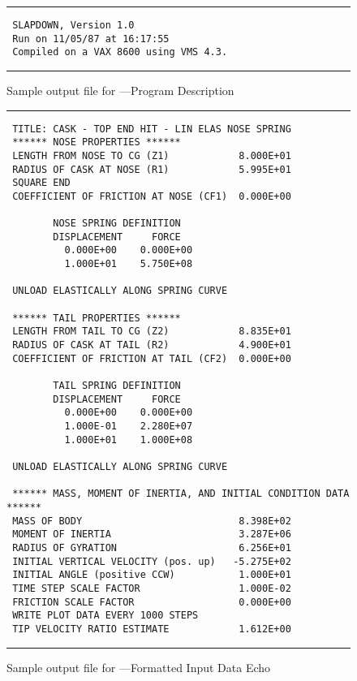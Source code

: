 \begin{figure}
\parskip0pt
\hrule
\small
\begin{verbatim}
 SLAPDOWN, Version 1.0
 Run on 11/05/87 at 16:17:55
 Compiled on a VAX 8600 using VMS 4.3.
\end{verbatim}
\hrule
\caption{Sample output file for \SLAP---Program Description}\label{sampout1}
\end{figure}
\begin{figure}
\parskip0pt
\hrule\small
\begin{verbatim}
 TITLE: CASK - TOP END HIT - LIN ELAS NOSE SPRING
 ****** NOSE PROPERTIES ******
 LENGTH FROM NOSE TO CG (Z1)            8.000E+01
 RADIUS OF CASK AT NOSE (R1)            5.995E+01
 SQUARE END
 COEFFICIENT OF FRICTION AT NOSE (CF1)  0.000E+00

        NOSE SPRING DEFINITION
        DISPLACEMENT     FORCE
          0.000E+00    0.000E+00
          1.000E+01    5.750E+08

 UNLOAD ELASTICALLY ALONG SPRING CURVE

 ****** TAIL PROPERTIES ******
 LENGTH FROM TAIL TO CG (Z2)            8.835E+01
 RADIUS OF CASK AT TAIL (R2)            4.900E+01
 COEFFICIENT OF FRICTION AT TAIL (CF2)  0.000E+00

        TAIL SPRING DEFINITION
        DISPLACEMENT     FORCE
          0.000E+00    0.000E+00
          1.000E-01    2.280E+07
          1.000E+01    1.000E+08

 UNLOAD ELASTICALLY ALONG SPRING CURVE

 ****** MASS, MOMENT OF INERTIA, AND INITIAL CONDITION DATA ******
 MASS OF BODY                           8.398E+02
 MOMENT OF INERTIA                      3.287E+06
 RADIUS OF GYRATION                     6.256E+01
 INITIAL VERTICAL VELOCITY (pos. up)   -5.275E+02
 INITIAL ANGLE (positive CCW)           1.000E+01
 TIME STEP SCALE FACTOR                 1.000E-02
 FRICTION SCALE FACTOR                  0.000E+00
 WRITE PLOT DATA EVERY 1000 STEPS
 TIP VELOCITY RATIO ESTIMATE            1.612E+00
\end{verbatim}
\hrule
\caption{Sample output file for \SLAP---Formatted Input
Data Echo}\label{sampout2}
\end{figure}

